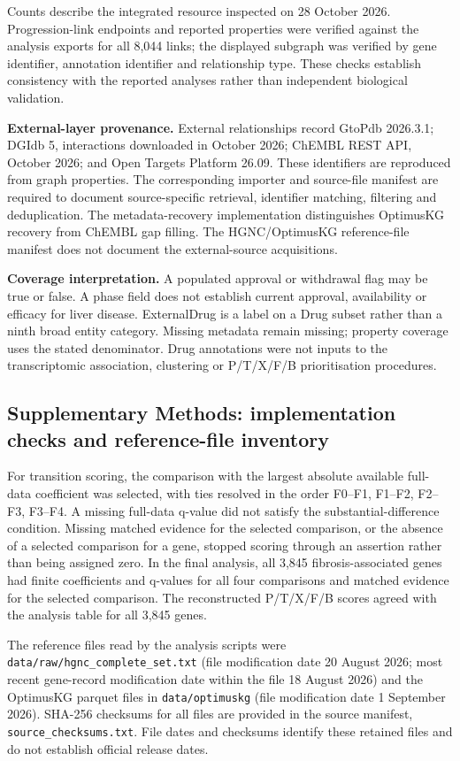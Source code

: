 \documentclass[11pt,a4paper]{article}
\begin{document}
\small
Counts describe the integrated resource inspected on 28 October 2026. Progression-link endpoints and reported properties were verified against the analysis exports for all 8,044 links; the displayed subgraph was verified by gene identifier, annotation identifier and relationship type. These checks establish consistency with the reported analyses rather than independent biological validation.

\textbf{External-layer provenance.} External relationships record GtoPdb 2026.3.1; DGIdb 5, interactions downloaded in October 2026; ChEMBL REST API, October 2026; and Open Targets Platform 26.09. These identifiers are reproduced from graph properties. The corresponding importer and source-file manifest are required to document source-specific retrieval, identifier matching, filtering and deduplication. The metadata-recovery implementation distinguishes OptimusKG recovery from ChEMBL gap filling. The HGNC/OptimusKG reference-file manifest does not document the external-source acquisitions.

\textbf{Coverage interpretation.} A populated approval or withdrawal flag may be true or false. A phase field does not establish current approval, availability or efficacy for liver disease. ExternalDrug is a label on a Drug subset rather than a ninth broad entity category. Missing metadata remain missing; property coverage uses the stated denominator. Drug annotations were not inputs to the transcriptomic association, clustering or P/T/X/F/B prioritisation procedures.
\endgroup

\subsection*{Supplementary Methods: implementation checks and reference-file inventory}
For transition scoring, the comparison with the largest absolute available full-data coefficient was selected, with ties resolved in the order F0--F1, F1--F2, F2--F3, F3--F4. A missing full-data q-value did not satisfy the substantial-difference condition. Missing matched evidence for the selected comparison, or the absence of a selected comparison for a gene, stopped scoring through an assertion rather than being assigned zero. In the final analysis, all 3,845 fibrosis-associated genes had finite coefficients and q-values for all four comparisons and matched evidence for the selected comparison. The reconstructed P/T/X/F/B scores agreed with the analysis table for all 3,845 genes.

The reference files read by the analysis scripts were \nolinkurl{data/raw/hgnc_complete_set.txt} (file modification date 20 August 2026; most recent gene-record modification date within the file 18 August 2026) and the OptimusKG parquet files in \nolinkurl{data/optimuskg} (file modification date 1 September 2026). SHA-256 checksums for all files are provided in the source manifest, \nolinkurl{source_checksums.txt}. File dates and checksums identify these retained files and do not establish official release dates.
\end{document}
